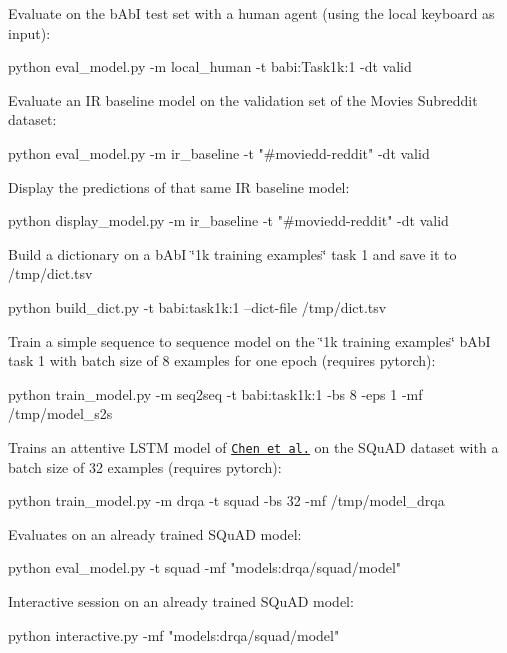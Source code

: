 Evaluate on the b\+AbI test set with a human agent (using the local keyboard as input)\+: 
\begin{DoxyCode}
python eval\_model.py -m local\_human -t babi:Task1k:1 -dt valid
\end{DoxyCode}


Evaluate an IR baseline model on the validation set of the Movies Subreddit dataset\+: 
\begin{DoxyCode}
python eval\_model.py -m ir\_baseline -t "#moviedd-reddit" -dt valid
\end{DoxyCode}


Display the predictions of that same IR baseline model\+: 
\begin{DoxyCode}
python display\_model.py -m ir\_baseline -t "#moviedd-reddit" -dt valid
\end{DoxyCode}


Build a dictionary on a b\+AbI \char`\"{}1k training examples\char`\"{} task 1 and save it to /tmp/dict.tsv 
\begin{DoxyCode}
python build\_dict.py -t babi:task1k:1 --dict-file /tmp/dict.tsv
\end{DoxyCode}


Train a simple sequence to sequence model on the \char`\"{}1k training examples\char`\"{} b\+AbI task 1 with batch size of 8 examples for one epoch (requires pytorch)\+: 
\begin{DoxyCode}
python train\_model.py -m seq2seq -t babi:task1k:1 -bs 8 -eps 1 -mf /tmp/model\_s2s
\end{DoxyCode}


Trains an attentive L\+S\+TM model of \href{https://arxiv.org/abs/1704.00051}{\tt Chen et al.} on the S\+Qu\+AD dataset with a batch size of 32 examples (requires pytorch)\+: 
\begin{DoxyCode}
python train\_model.py -m drqa -t squad -bs 32 -mf /tmp/model\_drqa
\end{DoxyCode}


Evaluates on an already trained S\+Qu\+AD model\+: 
\begin{DoxyCode}
python eval\_model.py -t squad -mf "models:drqa/squad/model"
\end{DoxyCode}


Interactive session on an already trained S\+Qu\+AD model\+: 
\begin{DoxyCode}
python interactive.py -mf "models:drqa/squad/model"
\end{DoxyCode}
 